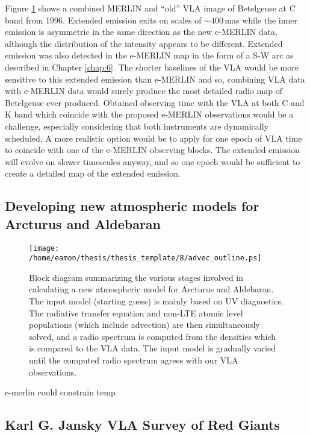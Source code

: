 Figure \ref{fig:8.3} shows a combined MERLIN and ``old'' VLA image of Betelgeuse at C band from 1996. Extended emission exits on scales of $\sim 400$\,mas while the inner emission is asymmetric in the same direction as the new e-MERLIN data, although the distribution of the intensity appears to be different. Extended emission was also detected in the e-MERLIN map in the form of a S-W arc as described in Chapter \ref{chap:6}. The shorter baselines of the VLA would be more sensitive to this extended emission than e-MERLIN and so, combining VLA data with e-MERLIN data would surely produce the most detailed radio map of Betelgeuse ever produced. Obtained observing time with the VLA at both C and K band which coincide with the proposed e-MERLIN observations would be a challenge, especially considering that both instruments are dynamically scheduled. A more realistic option would be to apply for one epoch of VLA time to coincide with one of the e-MERLIN observing blocks. The extended emission will evolve on slower timescales anyway, and so one epoch would be sufficient to create a detailed map of the extended emission.

\subsection{Developing new atmospheric models for Arcturus and Aldebaran}\label{sec:8.2.3}

\begin{figure}[!ht]
\centering 
        \texttt{[image: /home/eamon/thesis/thesis\_template/8/advec\_outline.ps]}
\caption[Block diagram for atmospheric model development.]{Block diagram summarizing the various stages involved in calculating a new atmospheric model for Arcturus and Aldebaran. The input model (starting guess) is mainly based on UV diagnostics. The radiative transfer equation and non-LTE atomic level populations (which include advection) are then simultaneously solved, and a radio spectrum is computed from the densities which is compared to the VLA data. The input model is gradually varied until the computed radio spectrum agrees with our VLA observations.} 
\label{fig:8.3}
\end{figure}




e-merlin could constrain temp
\subsection{Karl G. Jansky VLA Survey of Red Giants}\label{sec:8.2.4}
